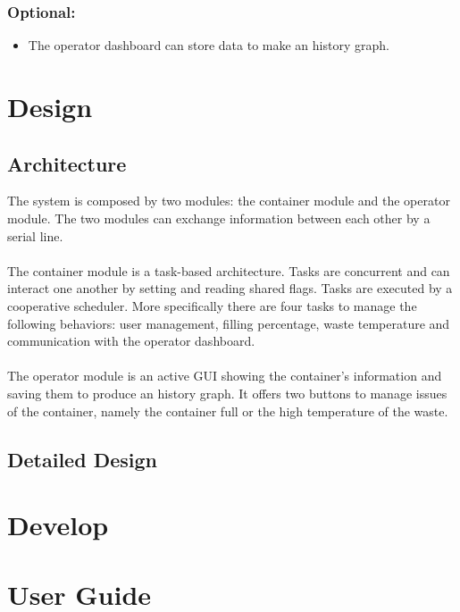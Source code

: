 \documentclass[a4paper,12pt]{report}
\begin{document}
        \subsection{Optional:}
            
            \begin{itemize}
                \item The operator dashboard can store data to make an history graph.
            \end{itemize}

\chapter{Design}

    \section{Architecture}

        The system is composed by two modules: the container module and the operator module.
        The two modules can exchange information between each other by a serial line.\\\\
        The container module is a task-based architecture. Tasks are concurrent and can interact one another by setting and reading shared flags. Tasks are executed by a cooperative scheduler.
        More specifically there are four tasks to manage the following behaviors: user management, filling percentage, waste temperature and communication with the operator dashboard.\\\\ 
        The operator module is an active GUI showing the container's information and saving them to produce an history graph.
        It offers two buttons to manage issues of the container, namely the container full or the high temperature of the waste.

        \section{Detailed Design}

\chapter{Develop}

\appendix
\chapter{User Guide}
\end{document}
